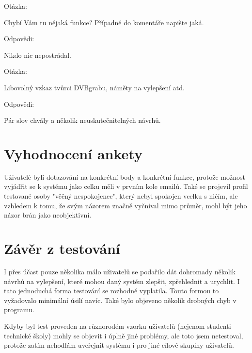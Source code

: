 \vspace{10pt}

\begin{bf}Otázka:\end{bf} Chybí Vám tu nějaká funkce? Případně do komentáře napište jaká.

\begin{bf}Odpovědi:\end{bf} Nikdo nic nepostrádal.
				
\vspace{10pt}

\begin{bf}Otázka:\end{bf} Libovolný vzkaz tvůrci DVBgrabu, náměty na vylepšení atd.

\begin{bf}Odpovědi:\end{bf} Pár slov chvály a několik neuskutečnitelných návrhů.

\vspace{10pt}

\section{Vyhodnocení ankety}

Uživatelé byli dotazování na konkrétní body a konkrétní funkce, protože možnost vyjádřit se k systému jako celku měli v prvním kole emailů. Také se projevil profil testované osoby "věčný nespokojenec", který nebyl spokojen vcelku s ničím, ale vzhledem k tomu, že svým názorem značně vyčníval mimo průměr, mohl být jeho názor brán jako neobjektivní.

\vspace{10pt}

\section{Závěr z testování}

I přes účast pouze několika málo uživatelů se podařilo dát dohromady několik návrhů na vylepšení, které mohou daný systém zlepšit, zpřehlednit a urychlit. I tato jednoduchá forma testování se rozhodně vyplatila. Touto formou to vyžadovalo minimální úsilí navíc. Také bylo objeveno několik drobných chyb v programu.

\vspace{10pt}

Kdyby byl test proveden na různorodém vzorku uživatelů (nejenom studenti technické školy) mohly se objevit i úplně jiné problémy, ale toto jsem netestoval, protože zatím nehodlám uveřejnit systému i pro jiné cílové skupiny uživatelů.
